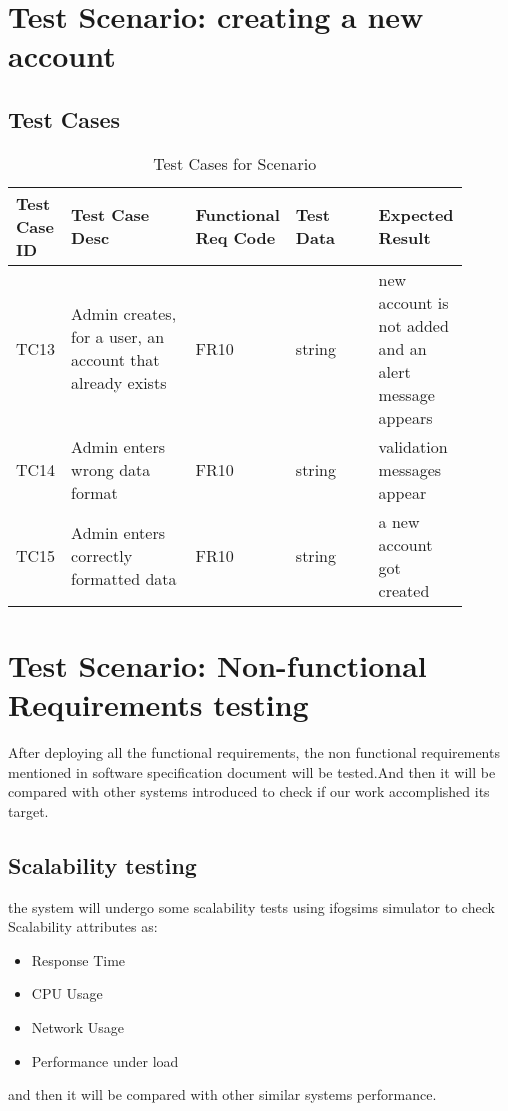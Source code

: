 \documentclass[12pt]{article}
\begin{document}
\section{Test Scenario: creating a new account}\label{sec:TSy}
\subsection{Test Cases}
\begin{table}[h]
\caption{Test Cases for Scenario}
\label{tab:TC1}
\begin{tabular}{|p{0.1\linewidth}|p{0.3\linewidth}|p{0.1\linewidth}|p{0.2\linewidth}|p{0.2\linewidth}|}
\hline
Test Case ID & Test Case Desc & Functional Req Code & Test Data & Expected Result \\ \hline
TC13  & Admin creates, for a user, an account that already exists & FR10 & string   & new account is not added and an alert message appears               \\ \hline
TC14 & Admin enters wrong data format   & FR10    &  string      &  validation messages appear         \\ \hline
TC15 & Admin enters correctly formatted data   & FR10    &  string      &  a new account got created         \\ \hline

\end{tabular}
\end{table}
\section{Test Scenario: Non-functional Requirements testing}
After deploying all the functional requirements, the non functional requirements mentioned in software specification document will be tested.And then it will be compared with other systems introduced to check if our work accomplished its target.
\subsection{Scalability testing}
the system will undergo some scalability tests using ifogsims simulator to check Scalability attributes as:\begin{itemize}
    \item Response Time
    \item CPU Usage
    \item Network Usage
    \item Performance under load
\end{itemize}
and then it will be compared with other similar systems performance.
\end{document}
